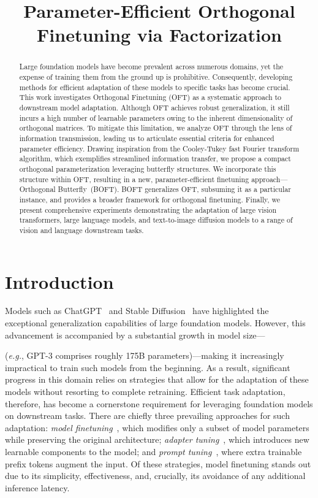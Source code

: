 \title{Parameter-Efficient Orthogonal Finetuning via Factorization}

\begin{abstract}
Large foundation models have become prevalent across numerous domains, yet the expense of training them from the ground up is prohibitive. Consequently, developing methods for efficient adaptation of these models to specific tasks has become crucial. This work investigates Orthogonal Finetuning (OFT) as a systematic approach to downstream model adaptation. Although OFT achieves robust generalization, it still incurs a high number of learnable parameters owing to the inherent dimensionality of orthogonal matrices. To mitigate this limitation, we analyze OFT through the lens of information transmission, leading us to articulate essential criteria for enhanced parameter efficiency. Drawing inspiration from the Cooley-Tukey fast Fourier transform algorithm, which exemplifies streamlined information transfer, we propose a compact orthogonal parameterization leveraging butterfly structures. We incorporate this structure within OFT, resulting in a new, parameter-efficient finetuning approach—Orthogonal Butterfly~(BOFT). BOFT generalizes OFT, subsuming it as a particular instance, and provides a broader framework for orthogonal finetuning. Finally, we present comprehensive experiments demonstrating the adaptation of large vision transformers, large language models, and text-to-image diffusion models to a range of vision and language downstream tasks.
\end{abstract}

\section{Introduction}

Models such as ChatGPT~\cite{brown2020language,chen2021evaluating} and Stable Diffusion~\cite{rombach2022high} have highlighted the exceptional generalization capabilities of large foundation models. However, this advancement is accompanied by a substantial growth in model size—

(\emph{e.g.}, GPT-3 comprises roughly 175B parameters)—making it increasingly impractical to train such models from the beginning. As a result, significant progress in this domain relies on strategies that allow for the adaptation of these models without resorting to complete retraining. Efficient task adaptation, therefore, has become a cornerstone requirement for leveraging foundation models on downstream tasks. There are chiefly three prevailing approaches for such adaptation: \emph{model finetuning}~\cite{hulora2022,zaken2022bitfit,guo2020parameter,raffel2020exploring,qiu2023controlling,zhang2022adaptive,chavan2023one}, which modifies only a subset of model parameters while preserving the original architecture; \emph{adapter tuning}~\cite{rebuffi2017learning,houlsby2019parameter,pfeiffer2020adapterfusion,lin2020exploring,he2021towards}, which introduces new learnable components to the model; and \emph{prompt tuning}~\cite{li2021prefix,lester2021power}, where extra trainable prefix tokens augment the input. Of these strategies, model finetuning stands out due to its simplicity, effectiveness, and, crucially, its avoidance of any additional inference latency.

